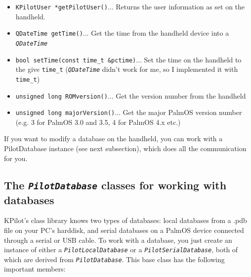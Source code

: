 \documentclass[10pt,a4paper]{article}
\newcommand{\code}[1]{{\small\texttt{#1}}}
\newcommand{\class}[1]{{\small\em\texttt{#1}}}
\begin{document}
\begin{itemize}
\item
    \code{KPilotUser *getPilotUser()}\qquad ... Returns the user 
    information as set on the handheld.


\item
    \code{QDateTime getTime()}\qquad ... Get the time from the handheld 
    device into a \class{QDateTime}
\item
    \code{bool setTime(const time\_t \&pctime)}\qquad ... Set the time 
    on the handheld to the give \code{time\_t} (\class{QDateTime} didn't 
    work for me, so I implemented it with \code{time\_t})


\item
    \code{unsigned long ROMversion()}\qquad ... Get the version number 
    from the handheld
\item
    \code{unsigned long majorVersion()}\qquad ... Get the major PalmOS 
    version number (e.g. 3 for PalmOS 3.0 and 3.5, 4 for PalmOS 4.x etc.)

\end{itemize}

If you want to modify a database on the handheld, you can work with a 
PilotDatabase instance (see next subsection), which does all the 
communication for you.



\subsection{The \class{PilotDatabase} classes for working with databases}
KPilot's class library knows two types of databases: local databases from 
a .pdb file on your PC's harddisk, and serial databases on a PalmOS device 
connected through a serial or USB cable. To work with a database, you just 
create an instance of either a \class{PilotLocalDatabase} or a 
\class{PilotSerialDatabase}, both of which are derived from 
\class{PilotDatabase}. This base class has the following important members:
\end{document}
